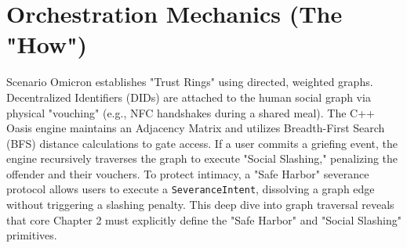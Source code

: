 \section{Orchestration Mechanics (The "How")}
Scenario Omicron establishes "Trust Rings" using directed, weighted graphs. Decentralized Identifiers (DIDs) are attached to the human social graph via physical "vouching" (e.g., NFC handshakes during a shared meal). The C++ Oasis engine maintains an Adjacency Matrix and utilizes Breadth-First Search (BFS) distance calculations to gate access. If a user commits a griefing event, the engine recursively traverses the graph to execute "Social Slashing," penalizing the offender and their vouchers. To protect intimacy, a "Safe Harbor" severance protocol allows users to execute a \texttt{SeveranceIntent}, dissolving a graph edge without triggering a slashing penalty. This deep dive into graph traversal reveals that core Chapter 2 must explicitly define the "Safe Harbor" and "Social Slashing" primitives.
